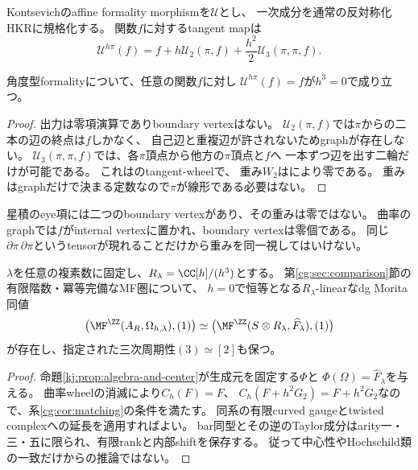 Kontsevichのaffine formality morphismを$\mathcal U$とし、
一次成分を通常の反対称化HKRに規格化する\cite[Sections~4--6]{PKontsevich}。
関数$f$に対するtangent mapは
\begin{equation}\label{kj:eq:tangent-map}
 \mathcal U^{h\pi}(f)=f+h\mathcal U_2(\pi,f)
 +\frac{h^2}{2}\mathcal U_3(\pi,\pi,f).
\end{equation}
\begin{lemma}[曲率側の二輪は消える]\label{kj:lem:curvature-wheel}
角度型formalityについて、任意の関数$f$に対し
$\mathcal U^{h\pi}(f)=f$が$h^3=0$で成り立つ。
\end{lemma}
\begin{proof}
出力は零項演算でありboundary vertexはない。
$\mathcal U_2(\pi,f)$では$\pi$からの二本の辺の終点は$f$しかなく、
自己辺と重複辺が許されないためgraphが存在しない。
$\mathcal U_3(\pi,\pi,f)$では、各$\pi$頂点から他方の$\pi$頂点と$f$へ
一本ずつ辺を出す二輪だけが可能である。
これは\cite[Section~8.3.3.1]{PKontsevich}のtangent-wheelで、
重み$W_2$は\cite[Section~1.3]{KJShoikhet}により零である。
重みはgraphだけで決まる定数なので$\pi$が線形である必要はない。
\end{proof}
星積のeye項には二つのboundary vertexがあり、その重みは零ではない。
曲率のgraphでは$f$がinternal vertexに置かれ、boundary vertexは零個である。
同じ$\partial\pi\,\partial\pi$というtensorが現れることだけから重みを同一視してはいけない。

\begin{theorem}[混合試験族の二次MF復元]
\label{kj:thm:curved-MC}\label{kj:thm:mf-reconstruction}
$\lambda$を任意の複素数に固定し、$R_\lambda=\CC[h]/(h^3)$とする。
第\ref{cg:sec:comparison}節の有限階数・冪等完備なMF圏について、
$h=0$で恒等となる$R_\lambda$-linearなdg Morita同値
\begin{equation}\label{kj:eq:mf-reconstruction}
 \bigl(\MF^{\ZZ}(A_R,\Omega_{h,\lambda}),(1)\bigr)
 \simeq
 \bigl(\MF^{\ZZ}(S\otimes R_\lambda,\widehat F_\lambda),(1)\bigr)
\end{equation}
が存在し、指定された三次周期性$(3)\simeq[2]$も保つ。
\end{theorem}
\begin{proof}
命題\ref{kj:prop:algebra-and-center}が生成元を固定する$\Phi$と
$\Phi(\Omega)=\widehat F_\lambda$を与える。
曲率wheelの消滅により$C_h(F)=F$、
$C_h(F+h^2G_2)=F+h^2G_2$なので、系\ref{cg:cor:matching}の条件を満たす。
同系の有限curved gaugeとtwisted complexへの延長を適用すればよい。
bar同型とその逆のTaylor成分はarity一・三・五に限られ、有限rankと内部shiftを保存する。
従って中心性やHochschild類の一致だけからの推論ではない。
\end{proof}

